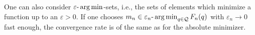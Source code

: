 One can also consider $\varepsilon\text{-}\operatorname*{arg\,min}$-sets, i.e., the sets of elements which minimize a function up to an $\varepsilon > 0$. If one chooses $m_n \in \varepsilon_n\text{-}\operatorname*{arg\,min}_{q\in\mathcal{Q}} F_n(q)$ with $\varepsilon_n \to 0$ fast enough, the convergence rate is of the same as for the absolute minimizer.
%
%
%
%
%
%
